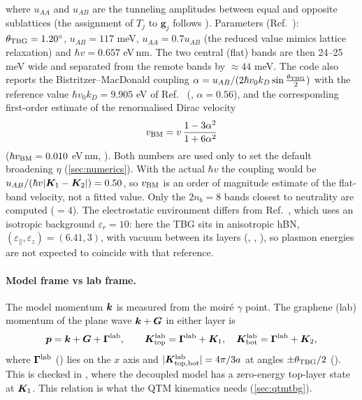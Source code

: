 where $u_{AA}$ and $u_{AB}$ are the tunneling amplitudes between equal and opposite sublattices (the assignment of $T_j$ to
$\bm g_j$ follows ). Parameters (Ref.~\cite{Wei2025}):
$\theta_{\rm TBG}=1.20^\circ$, $u_{AB}=117$ meV, $u_{AA}=0.7u_{AB}$ (the reduced value mimics lattice relaxation) and
$\hbar v=0.657$ eV\,nm. The two central (flat) bands are then 24--25 meV wide and separated from the remote bands by
$\approx44$ meV. The code also reports the Bistritzer--MacDonald coupling $\alpha=u_{AB}/(2\hbar v_0k_D\sin\frac{\theta_{\rm TBG}}2)$
with the reference value $\hbar v_0k_D=9.905$ eV of Ref.~\cite{BM2011} (, $\alpha=0.56$), and the
corresponding first-order estimate of the renormalised Dirac velocity~\cite{BM2011}
\begin{equation}
v_{\rm BM}=v\,\frac{1-3\alpha^2}{1+6\alpha^2}
\label{eq:vstar}
\end{equation}
($\hbar v_{\rm BM}=0.010$ eV\,nm, ). Both numbers are used only to set the default broadening $\eta$
(\cref{sec:numerics}). With the actual $\hbar v$ the coupling would be $u_{AB}/(\hbar v|\bm K_1-\bm K_2|)=0.50$, so $v_{\rm BM}$ is an order
of magnitude estimate of the flat-band velocity, not a fitted value. Only the $2n_b=8$ bands closest to neutrality are computed
($=4$). The electrostatic environment differs from Ref.~\cite{Wei2025}, which uses an
isotropic background $\varepsilon_r=10$: here the TBG sits in anisotropic hBN,
$(\varepsilon_\parallel,\varepsilon_z)=(6.41,3)$, with vacuum between its layers (,
, ), so plasmon energies are not expected to coincide with that reference.

\paragraph{Model frame vs lab frame.} The model momentum $\bm k$ is measured from the moir\'e $\gamma$ point.
The graphene (lab) momentum of the plane wave $\bm k+\bm G$ in either layer is
\begin{equation}
\bm p=\bm k+\bm G+\bm\Gamma^{\rm lab},\qquad \bm K^{\rm lab}_{\rm top}=\bm\Gamma^{\rm lab}+\bm K_1,\quad
\bm K^{\rm lab}_{\rm bot}=\bm\Gamma^{\rm lab}+\bm K_2,
\label{eq:labframe}
\end{equation}
where $\bm\Gamma^{\rm lab}$ () lies on the $x$ axis and $|\bm K^{\rm lab}_{\rm top,bot}|=4\pi/3a$
at angles $\pm\theta_{\rm TBG}/2$ (). This is checked in
, where the decoupled model has a zero-energy top-layer state at $\bm K_1$.
This relation is what the QTM kinematics needs (\cref{sec:qtmtbg}).

